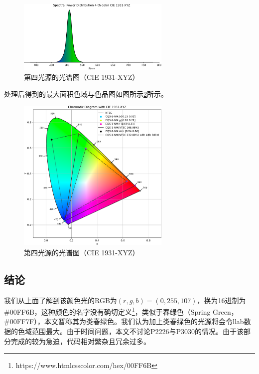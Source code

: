 \begin{figure}[htbp]
    \centering
    \includegraphics[width=0.65\textwidth]{./imgs/sec5/CQS-1-NM-spd-4.png}
    \caption{第四光源的光谱图（CIE 1931-XYZ）}
    \label{fig:spd1931-color4}
\end{figure}


处理后得到的最大面积色域与色品图如图所示\ref{fig:spd1931-4final}所示。

\begin{figure}[htbp]
    \centering
    \includegraphics[width=0.65\textwidth]{./imgs/sec5/CQS-1-NM-4-final.pdf}
    \caption{第四光源的光谱图（CIE 1931-XYZ）}
    \label{fig:spd1931-4final}
\end{figure}

\subsection{结论}
我们从上面了解到该颜色光的RGB为$(r,g,b)=(0,255,107)$，换为16进制为\#00FF6B，这种颜色的名字没有确切定义\footnote{https://www.htmlcsscolor.com/hex/00FF6B}，类似于春绿色（Spring Green，\#00FF7F），本文暂称其为类春绿色。我们认为加上类春绿色的光源将会令llab数据的色域范围最大。由于时间问题，本文不讨论P2226与P3030的情况。由于该部分完成的较为急迫，代码相对繁杂且冗余过多。

